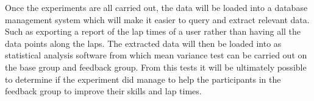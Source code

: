 	Once the experiments are all carried out, the data will be loaded into a database management system which will make it easier to query and extract relevant data. Such as exporting a report of the lap times of a user rather than having all the data points along the laps. The extracted data will then be loaded into as statistical analysis software from which mean variance test can be carried out on the base group and feedback group. From this tests it will be ultimately possible to determine if the experiment did manage to help the participants in the feedback group to improve their skills and lap times.